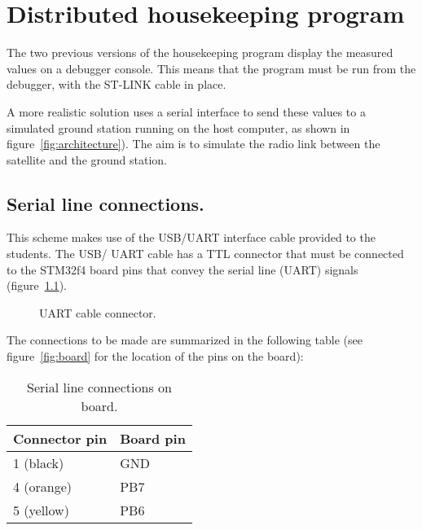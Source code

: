 \chapter{Distributed housekeeping program}\label{ch:Assignment5}

The two previous versions of the housekeeping program display the measured values on a debugger console. This means that the program must be run from the debugger, with the ST-LINK cable in place.

A more realistic solution uses a serial interface to send these values to a simulated ground station running on the host computer, as shown in figure~\ref{fig:architecture}). The aim is to simulate the radio link between the satellite and the ground station.

\section{Serial line connections.}\label{sc:serial}

This scheme makes use of the USB/UART interface cable provided to the students. The USB/ UART cable has a TTL connector that must be connected to the STM32f4 board pins that convey the serial line (UART) signals (figure~\ref{fig:cable}).

\begin{figure}[h]
            \caption{UART cable connector.}
            \label{fig:cable}
\end{figure}

The connections to be made are summarized in the following table (see figure~\ref{fig:board} for the location of the pins on the board):

\begin{table}[htb]
\begin{center}
\begin{tabular}{ll} \hline
Connector pin & Board pin \\ \hline
1 (black) & GND \\
4 (orange) & PB7 \\
5 (yellow) & PB6 \\ \hline
\end{tabular}
\caption{Serial line connections on board.}
\label{tb:connections}
\end{center}
\end{table}


